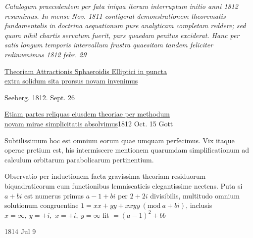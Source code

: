 \clearpage{}\NoSourceHead
\begingroup\fontsize{10}{15}\selectfont\itshape
\noindent Catalogum praecedentem per fata iniqua iterum interruptum
initio anni 1812 resumimus. In mense Nov. 1811 contigerat
demonstrationem theorematis fundamentalis in doctrina aequationum
pure analyticam completam reddere; sed quum nihil
chartis servatum fuerit, pars quaedam
penitus exciderat. Hanc per satis longum temporis intervallum
frustra quaesitam tandem feliciter redinvenimus 1812 febr. 29

\medskip
\noindent\underline{Theoriam Attractionis Sphaeroidis Elliptici in puncta}\\
\underline{extra solidum sita prorsus novam invenimus}
\par\noindent\hfill Seeberg. 1812. Sept. 26

\medskip
\noindent\underline{Etiam partes reliquas eiusdem theoriae per methodum}\\
\underline{novam mirae simplicitatis absolvimus}\hfill 1812 Oct. 15 Gott

\medskip
\noindent Subtilissimum hoc est omnium eorum quae umquam
perfecimus. Vix itaque operae pretium est, his intermiscere
mentionem quarumdam simplificationum ad calculum
orbitarum parabolicarum pertinentium.

\medskip
\noindent Observatio per inductionem facta gravissima theoriam residuorum biquadraticorum
cum functionibus lemniscaticis elegantissime nectens. Puta si \(a+bi\) est
numerus primus \(a-1+bi\) per \(2+2i\) divisibilis, multitudo omnium solutionum
congruentiae \(1=xx+yy+xxyy\ (\mathrm{mod}\ a+bi)\), inclusis \(x=\infty,\ y=\pm i,\)
\(x=\pm i,\ y=\infty\) fit \(=(a-1)^2+bb\)
\par\noindent\hfill 1814 Jul 9
\endgroup
